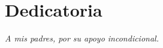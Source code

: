 \chapter*{Dedicatoria}
\thispagestyle{empty}
\begin{center}
	\textit{A mis padres, por su apoyo incondicional.}
\end{center}